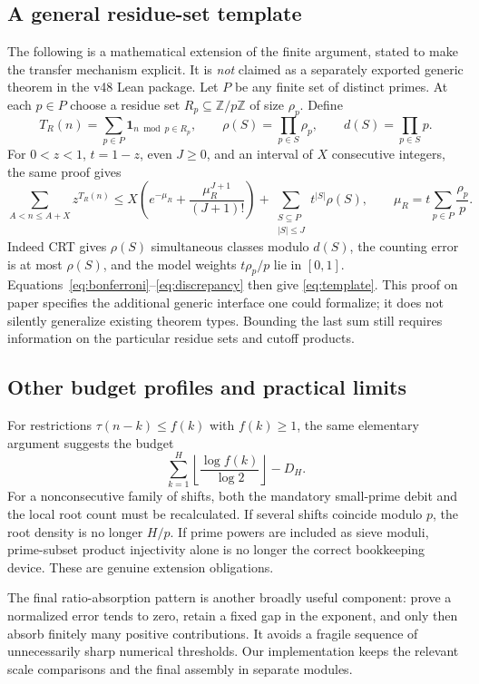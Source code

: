 \documentclass[11pt,a4paper]{article}
\theoremstyle{definition}
\theoremstyle{remark}
\numberwithin{equation}{section}
\newcommand{\Z}{\mathbb Z}
\newcommand{\ind}{\mathbf 1}
\newcommand{\floor}[1]{\left\lfloor #1\right\rfloor}
\begin{document}
\subsection{A general residue-set template}\label{sec:template}
The following is a mathematical extension of the finite argument, stated to
make the transfer mechanism explicit. It is \emph{not} claimed as a separately
exported generic theorem in the v48 Lean package.
Let $P$ be any finite set of distinct primes. At each $p\in P$ choose a residue
set $R_p\subseteq\Z/p\Z$ of size $\rho_p$. Define
\[
 T_R(n)=\sum_{p\in P}\ind_{n\bmod p\in R_p},\qquad
 \rho(S)=\prod_{p\in S}\rho_p,\qquad
 d(S)=\prod_{p\in S}p.
\]
For $0<z<1$, $t=1-z$, even $J\ge0$, and an interval of $X$ consecutive integers,
the same proof gives
\begin{equation}\label{eq:template}
 \sum_{A<n\le A+X}z^{T_R(n)}
 \le X\left(e^{-\mu_R}+\frac{\mu_R^{J+1}}{(J+1)!}\right)
  +\sum_{\substack{S\subseteq P\\|S|\le J}}t^{|S|}\rho(S),
 \qquad \mu_R=t\sum_{p\in P}\frac{\rho_p}{p}.
\end{equation}
Indeed CRT gives $\rho(S)$ simultaneous classes modulo $d(S)$, the counting
error is at most $\rho(S)$, and the model weights $t\rho_p/p$ lie in $[0,1]$.
Equations~\eqref{eq:bonferroni}--\eqref{eq:discrepancy} then give
\eqref{eq:template}. This proof on paper specifies the additional generic
interface one could formalize; it does not silently generalize existing theorem
types. Bounding the last sum still requires information on the particular
residue sets and cutoff products.

\subsection{Other budget profiles and practical limits}
For restrictions $\tau(n-k)\le f(k)$ with $f(k)\ge1$, the same elementary
argument suggests the budget
\[
 \sum_{k=1}^H\floor{\frac{\log f(k)}{\log2}}-D_H.
\]
For a nonconsecutive family of shifts, both the mandatory small-prime debit and
the local root count must be recalculated. If several shifts coincide modulo
$p$, the root density is no longer $H/p$. If prime powers are included as sieve
moduli, prime-subset product injectivity alone is no longer the correct
bookkeeping device. These are genuine extension obligations.

The final ratio-absorption pattern is another broadly useful component: prove
a normalized error tends to zero, retain a fixed gap in the exponent, and
only then absorb finitely many positive contributions. It avoids a fragile
sequence of unnecessarily sharp numerical thresholds. Our implementation
keeps the relevant scale comparisons and the final assembly in separate
modules.
\end{document}
